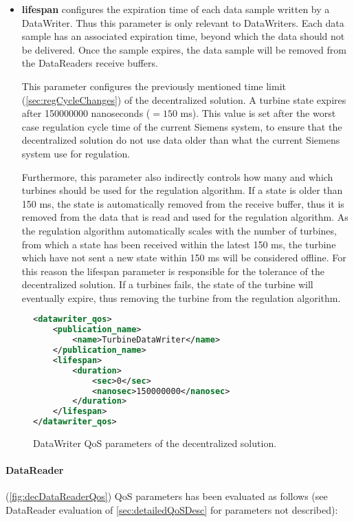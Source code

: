 \begin{itemize}
	\item \textbf{lifespan} configures the expiration time of each data sample written by a DataWriter. Thus this parameter is only relevant to DataWriters. Each data sample has an associated expiration time, beyond which the data should not be delivered. Once the sample expires, the data sample will be removed from the DataReaders receive buffers. 
	
	This parameter configures the previously mentioned time limit (\cref{sec:regCycleChanges}) of the decentralized solution. A turbine state expires after 150000000 nanoseconds ($=150$ ms). This value is set after the worst case regulation cycle time of the current Siemens system, to ensure that the decentralized solution do not use data older than what the current Siemens system use for regulation.
	
	Furthermore, this parameter also indirectly controls how many and which turbines should be used for the regulation algorithm. If a state is older than 150 ms, the state is automatically removed from the receive buffer, thus it is removed from the data that is read and used for the regulation algorithm. As the regulation algorithm automatically scales with the number of turbines, from which a state has been received within the latest 150 ms, the turbine which have not sent a new state within 150 ms will be considered offline. For this reason the lifespan parameter is responsible for the tolerance of the decentralized solution. If a turbines fails, the state of the turbine will eventually expire, thus removing the turbine from the regulation algorithm.
\end{itemize}

\begin{figure}[!h]
\begin{lstlisting}[language=XML]
<datawriter_qos>
	<publication_name>
		<name>TurbineDataWriter</name>
	</publication_name>
	<lifespan>
		<duration>
			<sec>0</sec>
			<nanosec>150000000</nanosec>
		</duration>
	</lifespan>
</datawriter_qos>
\end{lstlisting}
\caption[Decentralized DataWriter QoS parameters]{
		\label{fig:decDataWriterQos} 
		\footnotesize{DataWriter QoS parameters of the decentralized solution.}
	}
\end{figure}

\paragraph{DataReader} (\cref{fig:decDataReaderQos}) QoS parameters has been evaluated as follows (see DataReader evaluation of \cref{sec:detailedQoSDesc} for parameters not described):

